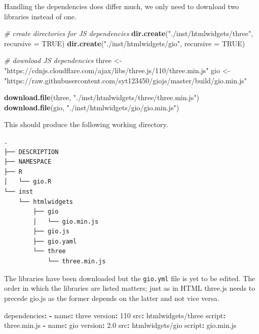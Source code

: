 \documentclass[
]{krantz}
\makeatletter
\newenvironment{Shaded}{\begin{snugshade}}{\end{snugshade}}
\newcommand{\AttributeTok}[1]{\textcolor[rgb]{0.61,0.61,0.61}{#1}}
\newcommand{\CommentTok}[1]{\textcolor[rgb]{0.37,0.37,0.37}{\textit{#1}}}
\newcommand{\DataTypeTok}[1]{\textcolor[rgb]{0.27,0.27,0.27}{#1}}
\newcommand{\DecValTok}[1]{\textcolor[rgb]{0.06,0.06,0.06}{#1}}
\newcommand{\FloatTok}[1]{\textcolor[rgb]{0.06,0.06,0.06}{#1}}
\newcommand{\FunctionTok}[1]{\textcolor[rgb]{0,0,0}{#1}}
\newcommand{\KeywordTok}[1]{\textcolor[rgb]{0.27,0.27,0.27}{\textbf{#1}}}
\newcommand{\NormalTok}[1]{#1}
\newcommand{\OtherTok}[1]{\textcolor[rgb]{0.37,0.37,0.37}{#1}}
\newcommand{\StringTok}[1]{\textcolor[rgb]{0.5,0.5,0.5}{#1}}
\newenvironment{kframe}{%
\medskip{}
\setlength{\fboxsep}{.8em}
 \def\at@end@of@kframe{}%
 \ifinner\ifhmode%
  \def\at@end@of@kframe{\end{minipage}}%
  \begin{minipage}{\columnwidth}%
 \fi\fi%
 \def\FrameCommand##1{\hskip\@totalleftmargin \hskip-\fboxsep
 \colorbox{shadecolor}{##1}\hskip-\fboxsep
     \hskip-\linewidth \hskip-\@totalleftmargin \hskip\columnwidth}%
 \MakeFramed {\advance\hsize-\width
   \@totalleftmargin\z@ \linewidth\hsize
   \@setminipage}}%
 {\par\unskip\endMakeFramed%
 \at@end@of@kframe}
\renewenvironment{Shaded}{\begin{kframe}}{\end{kframe}}
\makeatother
\begin{document}
Handling the dependencies does differ much, we only need to download two libraries instead of one.

\begin{Shaded}
\begin{Highlighting}[]
\CommentTok{\# create directories for JS dependencies}
\KeywordTok{dir.create}\NormalTok{(}\StringTok{"./inst/htmlwidgets/three"}\NormalTok{, }\DataTypeTok{recursive =} \OtherTok{TRUE}\NormalTok{)}
\KeywordTok{dir.create}\NormalTok{(}\StringTok{"./inst/htmlwidgets/gio"}\NormalTok{, }\DataTypeTok{recursive =} \OtherTok{TRUE}\NormalTok{)}

\CommentTok{\# download JS dependencies}
\NormalTok{three <{-}}\StringTok{ "https://cdnjs.cloudflare.com/ajax/libs/three.js/110/three.min.js"}
\NormalTok{gio <{-}}\StringTok{ "https://raw.githubusercontent.com/syt123450/giojs/master/build/gio.min.js"}

\KeywordTok{download.file}\NormalTok{(three, }\StringTok{"./inst/htmlwidgets/three/three.min.js"}\NormalTok{)}
\KeywordTok{download.file}\NormalTok{(gio, }\StringTok{"./inst/htmlwidgets/gio/gio.min.js"}\NormalTok{)}
\end{Highlighting}
\end{Shaded}

This should produce the following working directory.

\begin{verbatim}
.
├── DESCRIPTION
├── NAMESPACE
├── R
│   └── gio.R
└── inst
    └── htmlwidgets
        ├── gio
        │   └── gio.min.js
        ├── gio.js
        ├── gio.yaml
        └── three
            └── three.min.js
\end{verbatim}

The libraries have been downloaded but the \texttt{gio.yml} file is yet to be edited. The order in which the libraries are listed matters; just as in HTML three.js needs to precede gio.js as the former depends on the latter and not vice versa.

\begin{Shaded}
\begin{Highlighting}[]
\FunctionTok{dependencies}\KeywordTok{:}
\AttributeTok{  }\KeywordTok{{-}}\AttributeTok{ }\FunctionTok{name}\KeywordTok{:}\AttributeTok{ three}
\AttributeTok{    }\FunctionTok{version}\KeywordTok{:}\AttributeTok{ }\DecValTok{110}
\AttributeTok{    }\FunctionTok{src}\KeywordTok{:}\AttributeTok{ htmlwidgets/three}
\AttributeTok{    }\FunctionTok{script}\KeywordTok{:}\AttributeTok{ three.min.js}
\AttributeTok{  }\KeywordTok{{-}}\AttributeTok{ }\FunctionTok{name}\KeywordTok{:}\AttributeTok{ gio}
\AttributeTok{    }\FunctionTok{version}\KeywordTok{:}\AttributeTok{ }\FloatTok{2.0}
\AttributeTok{    }\FunctionTok{src}\KeywordTok{:}\AttributeTok{ htmlwidgets/gio}
\AttributeTok{    }\FunctionTok{script}\KeywordTok{:}\AttributeTok{ gio.min.js}
\end{Highlighting}
\end{Shaded}
\end{document}
